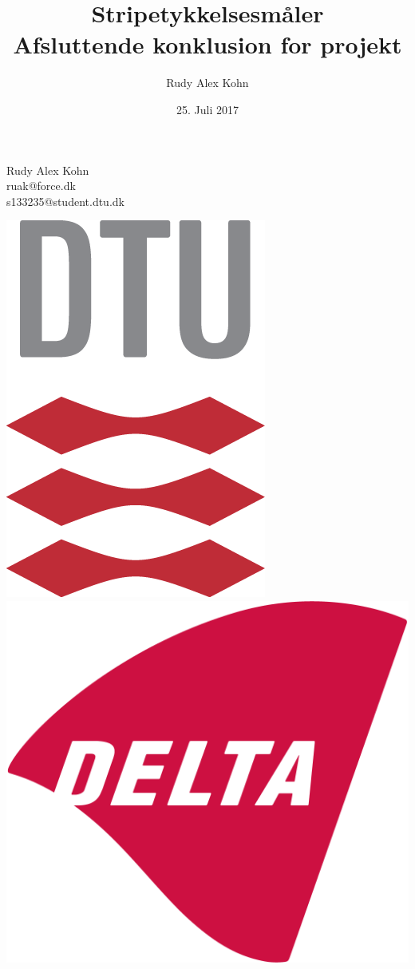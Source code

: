 \documentclass[11pt,a4paper,danish]{article}
\title{Stripetykkelsesmåler\\Afsluttende konklusion for projekt}
\author{Rudy Alex Kohn}
\date{25. Juli 2017}
\begin{document}
\maketitle
\renewcommand{\contentsname}{Indeks}
\renewcommand{\listfigurename}{Figurliste}
\renewcommand{\figurename}{Figur}
\renewcommand\refname{Referencer}

\begin{center}
Rudy Alex Kohn\\
ruak@force.dk\\
s133235@student.dtu.dk
\end{center}

\vspace{25mm}

\begin{center}
\includegraphics[scale=0.3]{Billeder/kunlogo.png}
\includegraphics[scale=0.15]{Billeder/DELTA_1024px.png}
\end{center}
\end{document}

